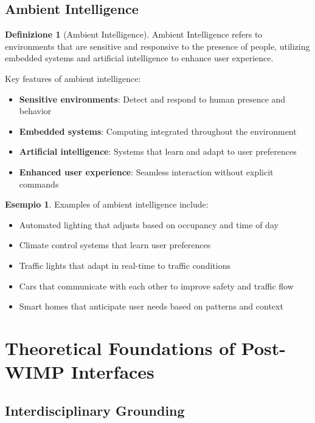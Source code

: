 \documentclass[11pt,a4paper]{article}
\theoremstyle{definition}
\newtheorem{definition}{Definizione}[section]
\newtheorem{example}{Esempio}[section]
\theoremstyle{plain}
\theoremstyle{remark}
\begin{document}
\subsection{Ambient Intelligence}

\begin{definition}[Ambient Intelligence]
Ambient Intelligence refers to environments that are sensitive and responsive to the presence of people, utilizing embedded systems and artificial intelligence to enhance user experience.
\end{definition}

Key features of ambient intelligence:

\begin{itemize}
    \item \textbf{Sensitive environments}: Detect and respond to human presence and behavior
    \item \textbf{Embedded systems}: Computing integrated throughout the environment
    \item \textbf{Artificial intelligence}: Systems that learn and adapt to user preferences
    \item \textbf{Enhanced user experience}: Seamless interaction without explicit commands
\end{itemize}

\begin{example}
Examples of ambient intelligence include:
\begin{itemize}
    \item Automated lighting that adjusts based on occupancy and time of day
    \item Climate control systems that learn user preferences
    \item Traffic lights that adapt in real-time to traffic conditions
    \item Cars that communicate with each other to improve safety and traffic flow
    \item Smart homes that anticipate user needs based on patterns and context
\end{itemize}
\end{example}

\section{Theoretical Foundations of Post-WIMP Interfaces}

\subsection{Interdisciplinary Grounding}
\end{document}
